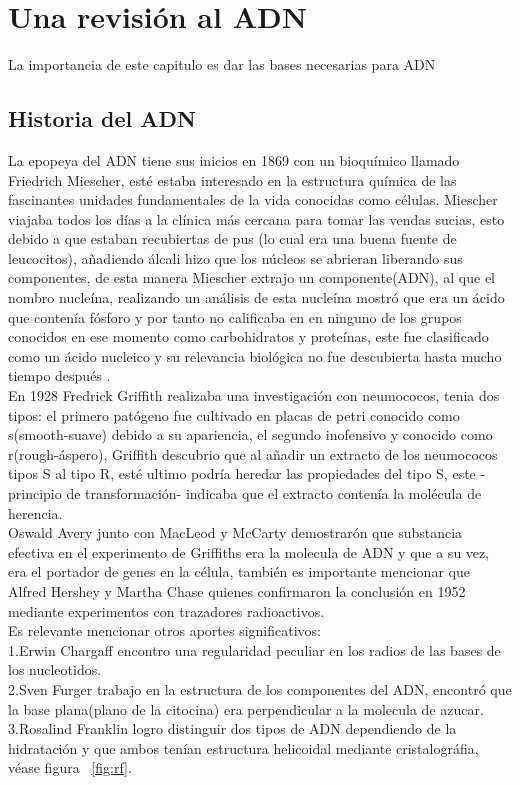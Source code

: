 
\clearpage

\section{Una revisión al ADN}
\label{sec:ADN}
La importancia de este capitulo es dar las bases necesarias para ADN


\subsection{Historia del ADN}
La epopeya del ADN tiene sus inicios en 1869 con un bioquímico llamado Friedrich Miescher, esté estaba interesado en la estructura química de las fascinantes unidades fundamentales de la vida conocidas como células.
Miescher viajaba todos los días a la clínica más cercana para tomar las vendas sucias, esto debido a que estaban recubiertas de pus (lo cual era una buena fuente de leucocitos), añadiendo álcali hizo que los núcleos se abrieran liberando sus componentes, de esta manera Miescher extrajo un componente(ADN), al que el nombro nucleína, realizando un análisis de esta nucleína mostró que era un ácido que contenía fósforo y por tanto no calificaba en en ninguno de los grupos conocidos en ese momento como carbohidratos y proteínas, este fue clasificado como un ácido nucleico y su relevancia biológica no fue descubierta hasta mucho tiempo después \cite{Susan}.\\

En 1928 Fredrick Griffith realizaba una investigación con neumococos, tenia dos tipos: el primero patógeno  fue cultivado en placas de petri conocido como s(smooth-suave) debido a su apariencia, el segundo inofensivo y conocido como r(rough-áspero), Griffith descubrio que al añadir un extracto de los neumococos tipos S al tipo R, esté ultimo podría heredar las propiedades del tipo S, este -principio de transformación- indicaba que el extracto contenía la molécula de herencia.\\

Oswald Avery junto con MacLeod y McCarty demostrarón que substancia efectiva en el experimento de Griffiths era la molecula de ADN y que a su vez, era el portador de genes en la célula, también es importante mencionar que Alfred Hershey y Martha Chase quienes confirmaron la conclusión en 1952 mediante experimentos con trazadores radioactivos\cite{Thormod}.\\

Es relevante mencionar otros aportes significativos: \\
1.Erwin Chargaff encontro una regularidad peculiar en los radios de las bases de los nucleotidos.\\
2.Sven Furger trabajo en la estructura de los componentes del ADN, encontró que la base plana(plano de la citocina) era perpendicular a la molecula de azucar.\\
3.Rosalind Franklin logro distinguir dos tipos de ADN dependiendo de la hidratación y que ambos tenían estructura helicoidal mediante cristalográfia, véase figura ~\ref{fig:rf}.

